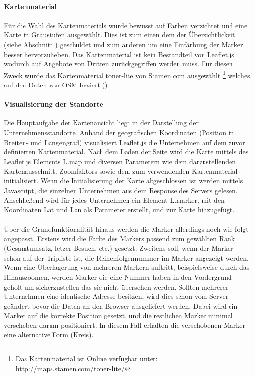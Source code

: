 \documentclass[Bachelorarbeit.tex]{subfiles}
\begin{document}
\paragraph{Kartenmaterial}
Für die Wahl des Kartenmaterials wurde bewusst auf Farben verzichtet und eine Karte in Graustufen ausgewählt. 
Dies ist zum einen dem der Übersichtlickeit (siehe Abschnitt ) geschuldet und zum anderen um eine Einfärbung der Marker besser hervorzuheben.
Das Kartenmaterial ist kein Bestandteil von Leaflet.js wodurch auf Angebote von Dritten zurückgegriffen werden muss.
Für diesen Zweck wurde das Kartenmaterial toner-lite von Stamen.com ausgewählt
	\footnote{Das Kartenmaterial ist Online verfügbar unter: http://maps.stamen.com/toner-lite/}  
welches auf den Daten von \ac{OSM} basiert (\cite[vgl.][]{Stamen}). 


\paragraph{Visualisierung der Standorte}
\label{ImplVisualStandorte}
Die Hauptaufgabe der Kartenansicht liegt in der Darstellung der Unternehmensstandorte.
Anhand der geografischen Koordinaten (Position in Breiten- und Längengrad) visualisiert Leaflet.js die Unternehmen auf dem zuvor definierten Kartenmaterial. 
Nach dem Laden der Seite wird die Karte mittels des Leaflet.js Elements L.map und diversen Parametern wie dem darzustellenden Kartenausschnitt, Zoomfaktors sowie dem zum verwendenden Kartenmaterial initialisiert.
Wenn die Initialisierung der Karte abgeschlossen ist werden mittels Javascript, die einzelnen Unternehmen aus dem Response des Servers gelesen. 
Anschließend wird für jedes Unternehmen ein Element L.marker, mit den Koordinaten Lat und Lon als Parameter erstellt, und zur Karte hinzugefügt. \\
\\
Über die Grundfunktionalität hinaus werden die Marker allerdings noch wie folgt angepasst.
Erstens wird die Farbe des Markers passend zum gewählten Rank (Gesamtumsatz, letzer Besuch, etc.) gesetzt.
Zweitens soll, wenn der Marker schon auf der Tripliste ist, die Reihenfolgennummer im Marker angezeigt werden.
Wenn eine Überlagerung von mehreren Markern auftritt, beispielsweise durch das Hinauszoomen, werden Marker die eine Nummer haben in den Vordergrund geholt um sicherzustellen das sie nicht übersehen werden.
Sollten mehrerer Unternehmen eine identische Adresse besitzen, wird dies schon vom Server geändert bevor die Daten an den Browser ausgeliefert werden.
Dabei wird ein Marker auf die korrekte Position gesetzt, und die restlichen Marker minimal verschoben darum positioniert.
In diesem Fall erhalten die verschobenen Marker eine alternative Form (Kreis).
\end{document}

